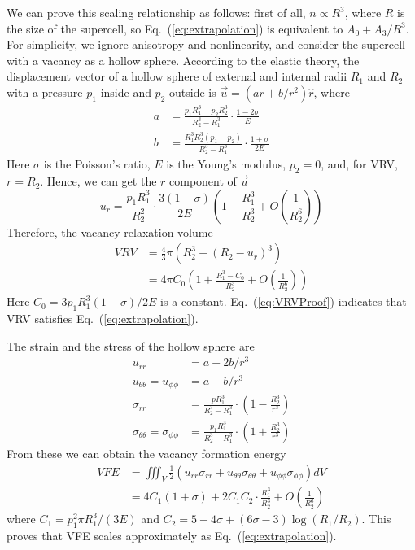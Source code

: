 \documentclass[%
 reprint,
 amsmath,amssymb,
 aps,
]{revtex4-1}
\begin{document}
We can prove this scaling relationship as follows:
first of all, $n\propto R^3$, where $R$ is the size of the supercell, so Eq.~(\ref{eq:extrapolation}) is equivalent to $A_0+A_3/R^3$.
For simplicity, we ignore anisotropy and nonlinearity, and consider the supercell with a vacancy as a hollow sphere.
According to the elastic theory, the displacement vector of a hollow sphere of external and internal radii $R_1$ and $R_2$ with a pressure $p_1$ inside and $p_2$ outside is $\vec{u} = \left(ar + b / r^2\right)\hat{r}$, where
\begin{align}
a &= \frac{p_1R_1^3-p_2R_2^3}{R_2^3-R_1^3}\cdot\frac{1-2\sigma}{E}\\
b &= \frac{R_1^3R_2^3(p_1-p_2)}{R_2^3-R_1^3}\cdot\frac{1+\sigma}{2E}
\end{align}
Here $\sigma$ is the Poisson's ratio, $E$ is the Young's modulus, $p_2=0$, and, for VRV, $r=R_2$. Hence, we can get the $r$ component of $\vec{u}$
\begin{equation}
\label{eq:ur}
u_r = \frac{p_1R_1^3}{R_2^2}\cdot\frac{3\left(1-\sigma\right)}{2E}\left(1+\frac{R_1^3}{R_2^3}+O\left(\frac{1}{R_2^6}\right)\right)
\end{equation}
Therefore, the vacancy relaxation volume
\begin{equation}
\label{eq:VRVProof}
\begin{split}
\mathit{VRV} & = \frac{4}{3}\pi\left(R_2^3-(R_2-u_r)^3\right)\\
 & = 4\pi C_0\left(1 + \frac{R_1^3-C_0}{R_2^3} + O\left(\frac{1}{R_2^6}\right)\right)
\end{split}
\end{equation}
Here $C_0 = 3p_1R_1^3(1-\sigma)/2E$ is a constant.
Eq.~(\ref{eq:VRVProof}) indicates that VRV satisfies Eq.~(\ref{eq:extrapolation}).

The strain and the stress of the hollow sphere are
\begin{align}
u_{rr} &= a - 2b/r^3\\
u_{\theta\theta} = u_{\phi\phi} &= a + b/r^3\\
\sigma_{rr} &= \frac{pR_1^3}{R_2^3-R_1^3}\cdot \left(1-\frac{R_2^3}{r^3}\right)\\
\sigma_{\theta\theta}=\sigma_{\phi\phi} &= \frac{p_1R_1^3}{R_2^3-R_1^3}\cdot\left(1+\frac{R_2^3}{r^3}\right)
\end{align}
From these we can obtain the vacancy formation energy
\begin{equation}
\label{eq:VFEProof}
\begin{split}
\mathit{VFE} & = \iiint_V \frac{1}{2} \left(u_{rr}\sigma_{rr} + u_{\theta\theta}\sigma_{\theta\theta} + u_{\phi\phi}\sigma_{\phi\phi}\right) dV\\
 & = 4C_1(1+\sigma)
 + 2C_1 C_2 \cdot\frac{R_1^3}{R_2^3}
 + O\left(\frac{1}{R_2^6}\right)
\end{split}
\end{equation}
where $C_1=p_1^2\pi R_1^3/(3E)$ and $C_2 = 5-4\sigma+(6\sigma-3) \log\left(R_1/R_2\right)$.
This proves that VFE scales approximately as Eq.~(\ref{eq:extrapolation}).
\end{document}
